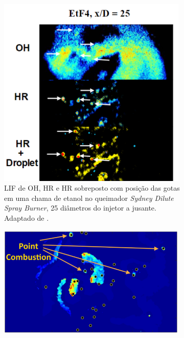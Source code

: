\begin{figure}[H]
    \centering
    \caption{Observações experimentais de combustão de gota isolada em chamas de etanol na Fig. \ref{fig:GounderJ2009-7.17} e \ref{fig:SinghG2020-10}, indicadas por setas, e ao redor de uma partícula de pó de alumínio na Fig. \ref{fig:Braconnier202PhD-5.20}. 
    Siglas: LIF -- \emph{Laser Induced Fluorescence}; HR -- \emph{Heat Release}.
    Adaptadas de \cite{GounderJ2009PhD,SinghG2020,Braconnier2020Pre}.
    }
    \begin{subfigure}[t]{0.32\textwidth}
        \centering
        \includegraphics[width=0.99\textwidth]{30_images/GounderJ2009-7.17-1.png}
        \caption{LIF de OH, HR e HR sobreposto com posição das gotas em uma chama de etanol no queimador \emph{Sydney Dilute Spray Burner}, 25 diâmetros do injetor a jusante. Adaptado de \cite[Fig. 7.13]{GounderJ2009PhD}.}
        \label{fig:GounderJ2009-7.17}
    \end{subfigure}
    \begin{subfigure}[t]{0.48\textwidth}
        \centering
        \includegraphics[width=0.99\textwidth]{30_images/SinghG2020-10.png}

\end{subfigure}
\end{figure}
